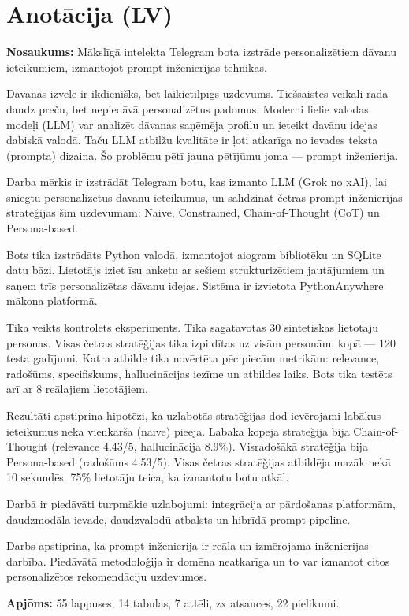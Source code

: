 \chapter*{Anot\=acija (LV)}

\textbf{Nosaukums:} M\=ak\-sl\=ig\=a intelekta Telegram bota izstr\=ade person\-aliz\=etiem d\=avanu ieteikumiem, izman\-tojot prompt inženierijas tehnikas.

D\=avanas izv\=ele ir ikdienišks, bet laikietilp\=igs uz\-de\-vums. Tieš\-saistes veikali r\=ada daudz pre\-\v cu, bet ne\-pied\=av\=a person\-aliz\=etus padomus. Mo\-derni lielie va\-lo\-das mode\-\c li (LLM) var ana\-liz\=et d\=avanas sa\-\c n\=em\=eja profilu un ie\-te\-ikt da\-v\=anu ide\-jas da\-bisk\=a va\-lo\-d\=a. Ta\-\v cu LLM at\-bilžu kva\-lit\=ate ir \c lo\-ti at\-ka\-r\=iga no ievades teksta (prompta) di\-zaina. Šo problē\-mu p\=et\=i jauna pē\-t\=ij\=umu jo\-ma — prompt in\-žen\-ierija.

Darba m\=er\c kis ir iz\-strā\-d\=at Tele\-gram botu, kas iz\-manto LLM (Grok no xAI), lai sniegtu person\-aliz\=etus d\=avanu iete\-ikumus, un sa\-l\=id\-zin\=at \v cetras prompt in\v zen\-ierijas stra\-t\=e\-\v gi\-jas šim uz\-de\-vu\-mam: Naive, Cons\-trai\-ned, Chain-of-Thought (CoT) un Per\-sona-based.

Bots tika izstr\=ad\=ats Python valod\=a, izmantojot aiogram bibliot\=eku un SQLite datu b\=azi. Lieto\-t\=ajs iziet \=isu anketu ar sešiem strukturi\-z\=etiem jaut\=ajumiem un sa\-\c nem trīs personaliz\=etas d\=avanu idejas. Sis\-t\=ema ir izvietota PythonAnywhere m\=ako\-\c na pla\-tform\=a.

Tika veikts kontrol\=ets eksperiments. Tika sagatavotas 30 sin\-t\=etiskas lietot\=aju per\-sonas. Visas \v cetras stra\-t\=e\-\v gi\-jas tika izpild\=itas uz vis\=am person\=am, kop\=a — 120 testa gad\=ijumi. Katra atbilde tika nov\=ert\=eta p\=ec piec\=am metrik\=am: re\-le\-vance, ra\-doš\=ums, specifis\-kums, halluci\-n\=acijas iezīme un at\-bildes laiks. Bots tika test\=ets ar\=i ar 8 re\=alajiem lietot\=ajiem.

Rezult\=ati apstiprina hipot\=ezi, ka uzlabot\=as stra\-t\=e\-\v gi\-jas dod ie\-v\=ero\-jami labākus iete\-ikumus nek\=a vienkārš\=a (naive) pieeja. Lab\=ak\=a kop\=ej\=a stra\-t\=e\-\v gi\-ja bija Chain-of-Thought (relevance 4.43/5, hallucin\=acija 8.9\%). Visradoš\=ak\=a stra\-t\=e\-\v gi\-ja bija Persona-based (radoš\=ums 4.53/5). Visas \v cetras stra\-t\=e\-\v gi\-jas atbild\=eja mazāk nek\=a 10 sekund\=es. 75\% lietot\=aju teica, ka izmantotu botu atk\=al.

Darb\=a ir pied\=av\=ati turp\-m\=akie uzla\-bo\-jumi: integr\=acija ar p\=ardošanas platform\=am, daudz\-mod\=ala ievade, daudzva\-lod\=u atbalsts un hib\-r\=id\=a prompt pipeline.

Darbs ap\-stiprina, ka prompt in\-žen\-ierija ir re\=ala un izm\=erojama in\-žen\-ierijas dar\-b\=iba. Pied\=av\=at\=a meto\-do\-lo\-\v gi\-ja ir do\-m\=ena ne\-at\-ka\-r\=iga un to var izmantot citos personaliz\=etos rekomend\=aciju uzde\-vumos.

\textbf{Apj\=oms:} 55 lappuses, 14 tabulas, 7 at\-tē\-li, zx atsauces, 22 pielikumi.
